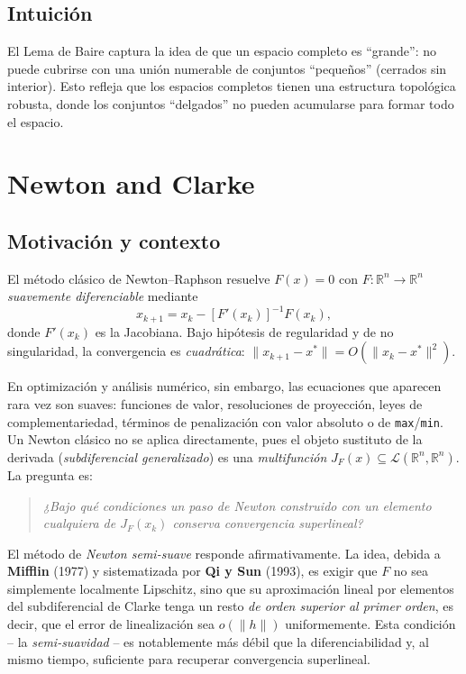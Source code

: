 \documentclass[12pt]{book}
\newcommand{\R}{\mathbb{R}}
\theoremstyle{definition}
\theoremstyle{plain}
\theoremstyle{remark}
\begin{document}
\section*{Intuición}
El Lema de Baire captura la idea de que un espacio completo es ``grande'': no puede cubrirse con una unión numerable de conjuntos ``pequeños'' (cerrados sin interior). Esto refleja que los espacios completos tienen una estructura topológica robusta, donde los conjuntos ``delgados'' no pueden acumularse para formar todo el espacio.

\chapter{Newton and Clarke}
\section{Motivación y contexto}\label{sec:motivacion}

El método clásico de Newton--Raphson resuelve
$F(x)=0$ con $F:\R^n\to\R^n$ \emph{suavemente diferenciable} mediante
\[
  x_{k+1}=x_k-[F'(x_k)]^{-1}F(x_k),
\]
donde $F'(x_k)$ es la Jacobiana.  Bajo hipótesis de regularidad y de
no singularidad, la convergencia es \emph{cuadrática}:
$\|x_{k+1}-x^*\|=O(\|x_k-x^*\|^2)$.

En optimización y análisis numérico, sin embargo, las ecuaciones que
aparecen rara vez son suaves: funciones de valor, resoluciones de
proyección, leyes de complementariedad, términos de penalización con
valor absoluto o de \texttt{max}/\texttt{min}.  Un Newton clásico no
se aplica directamente, pues el objeto sustituto de la derivada
(\emph{subdiferencial generalizado}) es una \emph{multifunción}
$J_F(x)\subseteq\mathcal{L}(\R^n,\R^n)$.  La pregunta es:

\begin{quote}
  \itshape ¿Bajo qué condiciones un paso de Newton construido con un
  elemento \emph{cualquiera} de $J_F(x_k)$ conserva convergencia
  \emph{superlineal}?
\end{quote}

El método de \emph{Newton semi-suave} responde afirmativamente.  La
idea, debida a \textbf{Mifflin} (1977) y sistematizada por
\textbf{Qi y Sun} (1993), es exigir que $F$ no sea simplemente
localmente Lipschitz, sino que su aproximación lineal por elementos
del subdiferencial de Clarke tenga un resto \emph{de orden superior
  al primer orden}, es decir, que el error de linealización sea
$o(\|h\|)$ uniformemente.  Esta condición -- la
\emph{semi-suavidad} -- es notablemente más débil que la
diferenciabilidad y, al mismo tiempo, suficiente para recuperar
convergencia superlineal.
\end{document}
